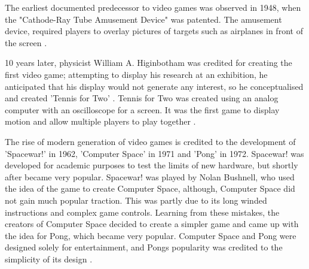 \documentclass[a4paper,11.5pt]{report}
\numberwithin{figure}{section}
\numberwithin{table}{section}
\numberwithin{equation}{section}
\numberwithin{equation}{section}
\begin{document}
The earliest documented predecessor to video games was observed in 1948, when the "Cathode-Ray Tube Amusement Device" was patented. The amusement device, required players to overlay pictures of targets such as airplanes in front of the screen \citep{TennisForTwo}.

10 years later, physicist William A. Higinbotham was credited for creating the first video game; attempting to display his research at an exhibition, he anticipated that his display would not generate any interest, so he conceptualised and created 'Tennis for Two' \citep{historyVideoGames}. Tennis for Two was created using an analog computer with an oscilloscope for a screen. It was the first game to display motion and allow multiple players to play together \citep{TennisForTwo}. 



The rise of modern generation of video games is credited to the development of 'Spacewar!' in 1962, 'Computer Space' in 1971 and 'Pong' in 1972. Spacewar! was developed for academic purposes to test the limits of new hardware, but shortly after became very popular. Spacewar! was played by Nolan Bushnell, who used the idea of the game to create Computer Space, although, Computer Space did not gain much popular traction. This was partly due to its long winded instructions and complex game controls. Learning from these mistakes, the creators of Computer Space decided to create a simpler game and came up with the idea for Pong, which became very popular. Computer Space and Pong were designed solely for entertainment, and Pongs popularity was credited to the simplicity of its design \citep{Lowood2009}.


\end{document}
